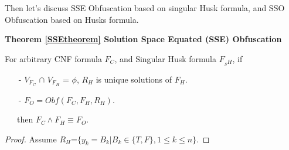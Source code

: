 \documentclass[conference]{IEEEtran}
\begin{document}
Then let's discuss SSE Obfuscation based on singular Husk formula,
and SSO Obfuscation based on Husks formula.

\textbf{Theorem \ref{SSEtheorem} Solution Space Equated (SSE) Obfuscation}

For arbitrary CNF formula $F_C$, and Singular Husk formula $F_{_SH}$, if
\begin{enumerate}
 \item[-] $V_{F_C}$ $\cap$ $V_{F_H}$ = $\phi$, $R_H$ is unique solutions of $F_H$.
 \item[-] $F_O=Obf(F_C,F_H,R_H)$.
\end{enumerate}
~~~then  $F_C\wedge F_H \equiv F_O$.
\begin{proof}

Assume $R_H$=$\{y_k=B_k| B_k \in \{T,F\}, 1\leqslant k\leqslant n\}$.
         

\end{proof}
\end{document}
